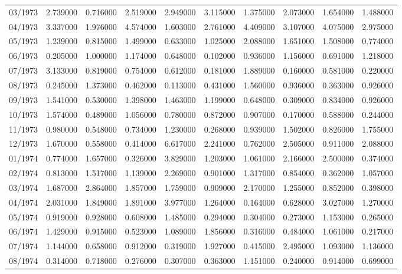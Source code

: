 \begin{tabular}{lrrrrrrrrr}
03/1973 & 2.739000 & 0.716000 & 2.519000 & 2.949000 & 3.115000 & 1.375000 & 2.073000 & 1.654000 & 1.488000 \\
04/1973 & 3.337000 & 1.976000 & 4.574000 & 1.603000 & 2.761000 & 4.409000 & 3.107000 & 4.075000 & 2.975000 \\
05/1973 & 1.239000 & 0.815000 & 1.499000 & 0.633000 & 1.025000 & 2.088000 & 1.651000 & 1.508000 & 0.774000 \\
06/1973 & 0.205000 & 1.000000 & 1.174000 & 0.648000 & 0.102000 & 0.936000 & 1.156000 & 0.691000 & 1.218000 \\
07/1973 & 3.133000 & 0.819000 & 0.754000 & 0.612000 & 0.181000 & 1.889000 & 0.160000 & 0.581000 & 0.220000 \\
08/1973 & 0.245000 & 1.373000 & 0.462000 & 0.113000 & 0.431000 & 1.560000 & 0.936000 & 0.363000 & 0.926000 \\
09/1973 & 1.541000 & 0.530000 & 1.398000 & 1.463000 & 1.199000 & 0.648000 & 0.309000 & 0.834000 & 0.926000 \\
10/1973 & 1.574000 & 0.489000 & 1.056000 & 0.780000 & 0.872000 & 0.907000 & 0.170000 & 0.588000 & 0.244000 \\
11/1973 & 0.980000 & 0.548000 & 0.734000 & 1.230000 & 0.268000 & 0.939000 & 1.502000 & 0.826000 & 1.755000 \\
12/1973 & 1.670000 & 0.558000 & 0.414000 & 6.617000 & 2.241000 & 0.762000 & 2.505000 & 0.911000 & 2.088000 \\
01/1974 & 0.774000 & 1.657000 & 0.326000 & 3.829000 & 1.203000 & 1.061000 & 2.166000 & 2.500000 & 0.374000 \\
02/1974 & 0.813000 & 1.517000 & 1.139000 & 2.269000 & 0.901000 & 1.317000 & 0.854000 & 0.362000 & 1.057000 \\
03/1974 & 1.687000 & 2.864000 & 1.857000 & 1.759000 & 0.909000 & 2.170000 & 1.255000 & 0.852000 & 0.398000 \\
04/1974 & 2.031000 & 1.849000 & 1.891000 & 3.977000 & 1.264000 & 0.164000 & 0.628000 & 3.027000 & 1.270000 \\
05/1974 & 0.919000 & 0.928000 & 0.608000 & 1.485000 & 0.294000 & 0.304000 & 0.273000 & 1.153000 & 0.265000 \\
06/1974 & 1.429000 & 0.915000 & 0.523000 & 1.089000 & 1.856000 & 0.316000 & 0.484000 & 1.061000 & 0.217000 \\
07/1974 & 1.144000 & 0.658000 & 0.912000 & 0.319000 & 1.927000 & 0.415000 & 2.495000 & 1.093000 & 1.136000 \\
08/1974 & 0.314000 & 0.718000 & 0.276000 & 0.307000 & 0.363000 & 1.151000 & 0.240000 & 0.914000 & 0.699000 \\

\end{tabular}
